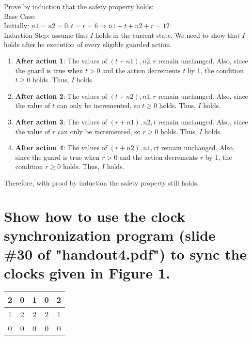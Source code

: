 \documentclass[times]{article}
\begin{document}
	\noindent Prove by induction that the safety property holds:\\
	Base Case:\\
	Initially: $n1=n2=0,t=r=6 \Rightarrow n1+t+n2+r=12$\\
	Induction Step: assume that $I$ holds in the current state. We need to show that $I$ holds after he execution of every eligible guarded action.
	\begin{enumerate}
		\item \textbf{After action 1}: The values of $(t+n1),n2,r$ remain unchanged. Also, since the guard is true when $t>0$ and the action decrements $t$ by 1, the condition $t \ge 0$ holds. Thus, $I$ holds.
		\item \textbf{After action 2}: The values of $(t+n2),n1,r$ remain unchanged. Also, since the value of $t$ can only be incremented, so $t \ge 0$ holds. Thus, $I$ holds.
		\item \textbf{After action 3}: The values of $(r+n1),n2,t$ remain unchanged. Also, since the value of $r$ can only be incremented, so $r \ge 0$ holds. Thus, $I$ holds.
		\item \textbf{After action 4}: The values of $(r+n2),n1,rt$ remain unchanged. Also, since the guard is true when $r>0$ and the action decrements $r$ by 1, the condition $r \ge 0$ holds. Thus, $I$ holds.
	\end{enumerate}
	Therefore, with proof by induction the safety property still holds.
	
	\section{Show how to use the clock synchronization program (slide \#30 of "handout4.pdf") to sync the clocks given in Figure 1.}%

	\begin{center}
		\begin{tabular}{ |c c c c c| } 
			\hline
			2 	& 0	& 1	& 0	& 2	\\ 
			\hline
			1 	& 2	& 2	& 2	& 1	\\ 
			\hline
			0 	& 0	& 0	& 0	& 0	\\ 
			\hline
		\end{tabular}
	\end{center}
	
	
		
\end{document}
